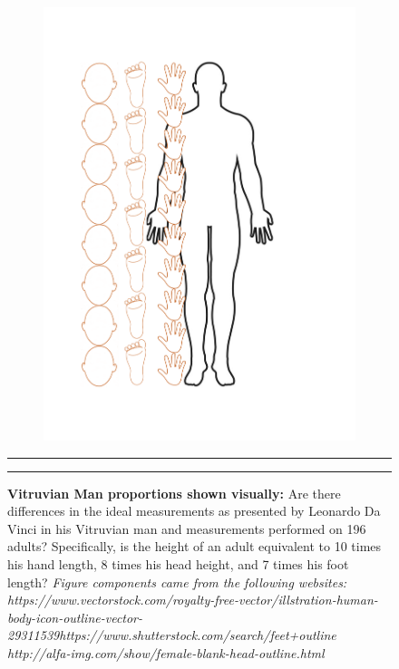 \documentclass[]{article}
\begin{document}
\begin{figure}[!ht]
    \begin{subfigure}[h]{\textwidth}
    \centering
            \includegraphics[trim = 0 0 0 0,clip,scale=0.5]{figures/final-image.pdf}
        \label{fig:sub-first}
    \end{subfigure}
    \vspace{2.5mm}
    \hrule
    \vspace{2.5mm}
        \caption{\textbf{Vitruvian Man proportions shown visually:} Are there differences in the ideal measurements as presented by Leonardo Da Vinci in his Vitruvian man and measurements performed on 196 adults? Specifically, is the height of an adult equivalent to 10 times his hand length, 8 times his head height, and 7 times his foot length? \citet{Wikipedia:Vitruvian} \tiny\emph{\newline\newline Figure components came from the following websites: \newline https://www.vectorstock.com/royalty-free-vector/illstration-human-body-icon-outline-vector-29311539\newline  https://www.shutterstock.com/search/feet+outline \newline  http://alfa-img.com/show/female-blank-head-outline.html}}
        \label{fig:combined}
    \vspace{-2.5mm}
    \hrule
\end{figure}
\end{document}
